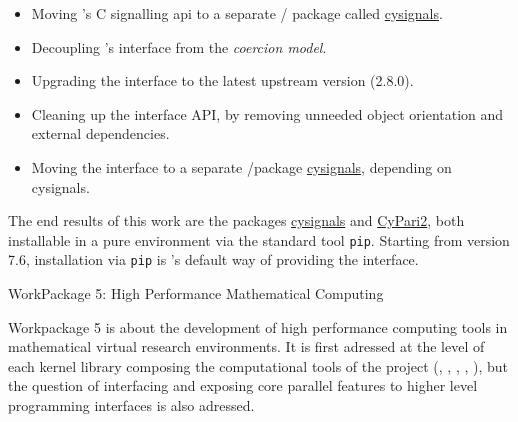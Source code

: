 \documentclass{deliverablereport}
\makeatletter
\renewcommand\subsubsection{\@startsection{subsubsection}{2}%
  \z@{.5\linespacing\@plus.7\linespacing}{.1\linespacing}%
  {\normalfont\bfseries}}
\makeatother
\begin{document}
\begin{itemize}
\tightlist
\item Moving \Sage's C signalling api to a separate \Python/\Cython
  package called
  \href{https://github.com/sagemath/cysignals}{cysignals}.
\item Decoupling \Sage's \Pari interface from the \emph{coercion
    model}.
\item Upgrading the \Pari interface to the latest upstream version
  (2.8.0).
\item Cleaning up the \Pari interface API, by removing unneeded object
  orientation and external dependencies.
\item Moving the \Pari interface to a separate \Python/\Cython package
  \href{https://github.com/sagemath/cysignals}{cysignals}, depending
  on cysignals.
\end{itemize}

The end results of this work are the packages
\href{https://github.com/sagemath/cysignals}{cysignals} and
\href{https://github.com/sagemath/cypari2}{CyPari2}, both installable
in a pure \Python environment via the standard tool
\texttt{pip}. Starting from version 7.6, installation via \texttt{pip}
is \Sage's default way of providing the \Pari interface.




\clearpage
  \subsubsection{WorkPackage 5: High Performance Mathematical Computing}

  Workpackage 5 is about the development of high performance computing tools in
  mathematical virtual research environments. It is first adressed at the level
  of each kernel library composing the computational tools of the project (\Pari,
  \GAP, \Linbox, \Singular, \MPIR), but the question of interfacing and exposing
  core parallel features to higher level programming interfaces is also
  adressed.
  
\end{document}
